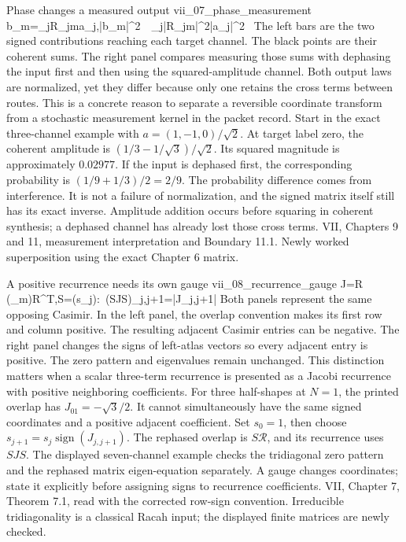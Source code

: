 {Phase changes a measured output}
{vii_07_phase_measurement}
{b_m=\sum_j\mathcal R_{jm}a_j,\qquad |b_m|^2\ \ \sum_j|\mathcal R_{jm}|^2|a_j|^2\ }
{The left bars are the two signed contributions reaching each target channel. The black points are their coherent sums. The right panel compares measuring those sums with dephasing the input first and then using the squared-amplitude channel. Both output laws are normalized, yet they differ because only one retains the cross terms between routes. This is a concrete reason to separate a reversible coordinate transform from a stochastic measurement kernel in the packet record.}
{Start in the exact three-channel example with $a=(1,-1,0)/\sqrt2$. At target label zero, the coherent amplitude is $(1/3-1/\sqrt3)/\sqrt2$. Its squared magnitude is approximately $0.02977$. If the input is dephased first, the corresponding probability is $(1/9+1/3)/2=2/9$. The probability difference comes from interference. It is not a failure of normalization, and the signed matrix itself still has its exact inverse.}
{Amplitude addition occurs before squaring in coherent synthesis; a dephased channel has already lost those cross terms.}
{VII, Chapters 9 and 11, measurement interpretation and Boundary 11.1. Newly worked superposition using the exact Chapter 6 matrix.}

{A positive recurrence needs its own gauge}
{vii_08_recurrence_gauge}
{J=\mathcal R\,(\lambda_m)\mathcal R^{\mathsf T},\qquad S=(s_j):\ (SJS)_{j,j+1}=|J_{j,j+1}|}
{Both panels represent the same opposing Casimir. In the left panel, the overlap convention makes its first row and column positive. The resulting adjacent Casimir entries can be negative. The right panel changes the signs of left-atlas vectors so every adjacent entry is positive. The zero pattern and eigenvalues remain unchanged. This distinction matters when a scalar three-term recurrence is presented as a Jacobi recurrence with positive neighboring coefficients.}
{For three half-shapes at $N=1$, the printed overlap has $J_{01}=-\sqrt3/2$. It cannot simultaneously have the same signed coordinates and a positive adjacent coefficient. Set $s_0=1$, then choose $s_{j+1}=s_j\operatorname{sign}(J_{j,j+1})$. The rephased overlap is $S\mathcal R$, and its recurrence uses $SJS$. The displayed seven-channel example checks the tridiagonal zero pattern and the rephased matrix eigen-equation separately.}
{A gauge changes coordinates; state it explicitly before assigning signs to recurrence coefficients.}
{VII, Chapter 7, Theorem 7.1, read with the corrected row-sign convention. Irreducible tridiagonality is a classical Racah input; the displayed finite matrices are newly checked.}

